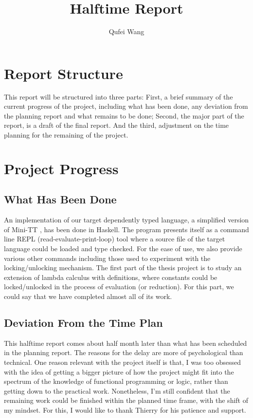 \documentclass{article}
\theoremstyle{remark}
\begin{document}
\title{Halftime Report}
\author{Qufei Wang}
\maketitle

\tableofcontents

\clearpage

\section{Report Structure}
This report will be structured into three parts: First, a brief summary of the current progress of the project, including what has been done, any deviation from the planning report and what remains to be done; Second, the major part of the report, is a draft of the final report. And the third, adjustment on the time planning for the remaining of the project.

\section{Project Progress}
\subsection{What Has Been Done}
An implementation of our target dependently typed language, a simplified version of Mini-TT \cite{coquand2009simple}, has been done in Haskell. The program presents itself as a command line REPL (read-evaluate-print-loop) tool where a source file of the target language could be loaded and type checked. For the ease of use, we also provide various other commands including those used to experiment with the locking/unlocking mechanism. The first part of the thesis project is to study an extension of lambda calculus with definitions, where constants could be locked/unlocked in the process of evaluation (or reduction). For this part, we could say that we have completed almost all of its work.

\subsection{Deviation From the Time Plan}
This halftime report comes about half month later than what has been scheduled in the planning report. The reasons for the delay are more of psychological than technical. One reason relevant with the project itself is that, I was too obsessed with the idea of getting a bigger picture of how the project might fit into the spectrum of the knowledge of functional programming or logic, rather than getting down to the practical work. Nonetheless, I'm still confident that the remaining work could be finished within the planned time frame, with the shift of my mindset. For this, I would like to thank Thierry for his patience and support.
\end{document}
